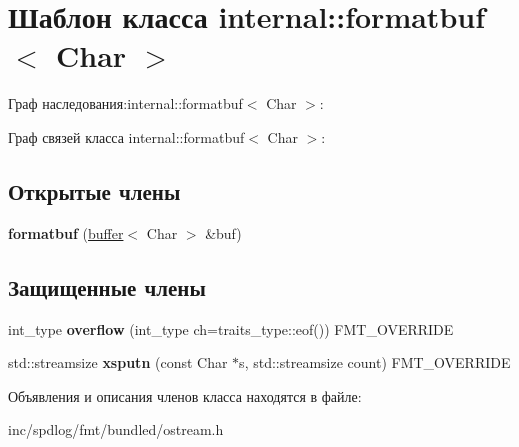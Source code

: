 \hypertarget{classinternal_1_1formatbuf}{}\section{Шаблон класса internal\+:\+:formatbuf$<$ Char $>$}
\label{classinternal_1_1formatbuf}


Граф наследования\+:internal\+:\+:formatbuf$<$ Char $>$\+:


Граф связей класса internal\+:\+:formatbuf$<$ Char $>$\+:
\subsection*{Открытые члены}
\begin{DoxyCompactItemize}
\item 
\mbox{\label{classinternal_1_1formatbuf_a5e6821ea339c6451694bfe8ac21978b2}} 
{\bfseries formatbuf} (\hyperlink{classinternal_1_1buffer}{buffer}$<$ Char $>$ \&buf)
\end{DoxyCompactItemize}
\subsection*{Защищенные члены}
\begin{DoxyCompactItemize}
\item 
\mbox{\label{classinternal_1_1formatbuf_a8bd06d6e45ceeb2e89956359e47aa9b7}} 
int\+\_\+type {\bfseries overflow} (int\+\_\+type ch=traits\+\_\+type\+::eof()) F\+M\+T\+\_\+\+O\+V\+E\+R\+R\+I\+DE
\item 
\mbox{\label{classinternal_1_1formatbuf_a59b8ab9a4c9907e4d6bae3861832e687}} 
std\+::streamsize {\bfseries xsputn} (const Char $\ast$s, std\+::streamsize count) F\+M\+T\+\_\+\+O\+V\+E\+R\+R\+I\+DE
\end{DoxyCompactItemize}


Объявления и описания членов класса находятся в файле\+:\begin{DoxyCompactItemize}
\item 
inc/spdlog/fmt/bundled/ostream.\+h\end{DoxyCompactItemize}
